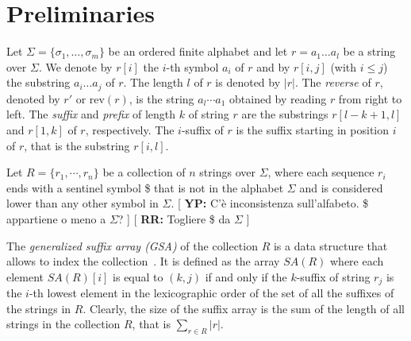 \documentclass[runningheads,envcountsame,a4paper]{llncs}
\newcommand{\notaestesa}[2]{%
 \marginpar{\color{red!75!black}\textbf{\texttimes}}%
 {\color{red!75!black}%
 [\,\textbullet\,\textsf{\textbf{#1:}} %
 \textsf{\footnotesize#2}\,\textbullet\,]}%
}
\newcommand{\YP}[1]{\notaestesa{YP}{#1}}
\newcommand{\rev}{\ensuremath{\textrm{rev}}}
\newcommand{\SA}{\ensuremath{\textit{SA}}}
\begin{document}
\begin{comment}
descrizione The FM-index .... [inserire citazione FM-index]

With the advent of NGS data, the investigation of the BWT has moved
towards its use in indexing huge collections of texts, represented by
the reads of variable length.
The notion of Extended Borrows Wheeler has been proposed to deal with a
collection of texts~\cite{Bauer2011} and its potentiality in
Bioinformatics to index read data has been investigated in ....

While the BWT has been deeply used for the alignment of reads to a
reference genome, for the first time the BWT has been explored as a tool
for de novo assembly.

In~\cite{Simpson2010} Durbin addresses the problem of having a more
efficient space FM-index implementation of the string graph problem.

---results----

\end{comment}


\section{Preliminaries}
Let $\Sigma = \{\sigma_1, \dots, \sigma_m\}$ be an ordered finite
alphabet and let $r = a_1 \dots a_l$ be a string over $\Sigma$.
We denote by $r[i]$ the $i$-th symbol $a_i$ of $r$ and by $r[i,j]$ (with
$i \leq j$) the substring $a_i \dots a_j$ of $r$.
The length $l$ of $r$ is denoted by $|r|$.
The \emph{reverse} of $r$, denoted by $r'$ or $\rev(r)$, is the string
$a_l \cdots a_1$ obtained by reading $r$ from right to left.
The \emph{suffix} and \emph{prefix} of length $k$ of string $r$ are the
substrings $r[l-k +1, l]$ and $r[1, k]$ of $r$, respectively.
The $i$-suffix of $r$ is the suffix starting in position $i$ of $r$,
that is the substring $r[i, l]$.

Let $R = \{r_1, \cdots, r_n\}$ be a collection of $n$ strings over
$\Sigma$, where each sequence $r_i$ ends with a sentinel symbol \$
that is not in the alphabet $\Sigma$ and is considered lower than
any other symbol in $\Sigma$.
\YP{C'è inconsistenza sull'alfabeto. \$ appartiene o meno a $\Sigma$?} \notaestesa{RR}{Togliere \$ da $\Sigma$}
The \emph{generalized suffix array (GSA)} of the collection $R$ is a data
structure that allows to index the collection~\cite{Shi1996}.
It is defined as the array $\SA(R)$ where each element $\SA(R)[i]$ is
equal to $(k, j)$ if and only if the $k$-suffix of string $r_{j}$ is the
$i$-th lowest element in the lexicographic order of the set of all the
suffixes of the strings in $R$.
Clearly, the size of the suffix array is the sum of the length of all
strings in the collection $R$, that is $\sum_{r \in R}|r|$.
\end{document}
